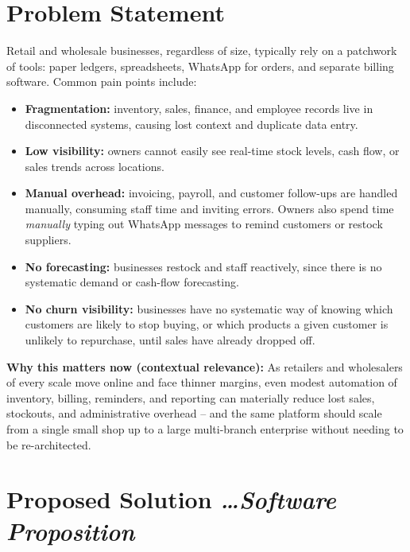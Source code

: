 \documentclass[11pt,a4paper]{article}
\newcommand{\BvrHint}[1]{%
  {\normalfont\normalsize\itshape\hfill #1}}
\begin{document}
\section{Problem Statement}
Retail and wholesale businesses, regardless of size, typically rely on a patchwork of tools:
paper ledgers, spreadsheets, WhatsApp for orders, and
separate billing software. Common pain points include:
\begin{itemize}[leftmargin=0.7cm]
    \item \textbf{Fragmentation:} inventory, sales, finance, and employee records live in disconnected systems, causing lost context and duplicate data entry.
    \item \textbf{Low visibility:} owners cannot easily see real-time stock levels, cash flow, or sales trends across locations.
    \item \textbf{Manual overhead:} invoicing, payroll, and customer follow-ups are handled manually, consuming staff time and inviting errors. Owners also spend time \emph{manually} typing out WhatsApp messages to remind customers or restock suppliers.
    \item \textbf{No forecasting:} businesses restock and staff reactively, since there is no systematic demand or cash-flow forecasting.
    \item \textbf{No churn visibility:} businesses have no systematic way of knowing which customers are likely to stop buying, or which products a given customer is unlikely to repurchase, until sales have already dropped off.
\end{itemize}

\textbf{Why this matters now (contextual relevance):} As retailers and wholesalers of every scale move online and face thinner margins, even modest automation of inventory, billing, reminders, and reporting can materially reduce lost sales, stockouts, and administrative overhead -- and the same platform should scale from a single small shop up to a large multi-branch enterprise without needing to be re-architected.

\section{Proposed Solution %
\BvrHint{\ldots Software Proposition}}
\end{document}

